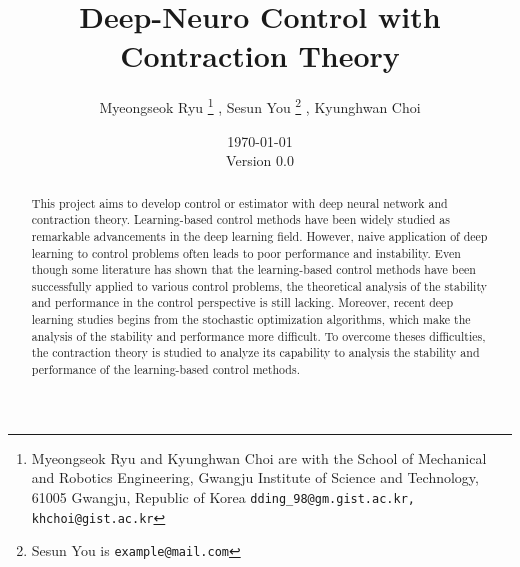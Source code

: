 \documentclass{article}
\title{
    Deep-Neuro Control with Contraction Theory
}
\author{
    Myeongseok Ryu
    \thanks{Myeongseok Ryu and Kyunghwan Choi are with the School of Mechanical and Robotics Engineering, Gwangju Institute of Science and Technology, 61005 Gwangju, Republic of Korea {\tt\small dding\_98@gm.gist.ac.kr, khchoi@gist.ac.kr}}%
    ,
    Sesun You
    \thanks{Sesun You is 
        {\tt\small example@mail.com}}%
    ,
    Kyunghwan Choi
    \footnotemark[1]
}
\date{
    \today
    \\
    Version 0.0
}
\newcommand*{\template}{../template}
\begin{document}
\maketitle

\begin{abstract}
    This project aims to develop control or estimator with deep neural network and contraction theory.
    Learning-based control methods have been widely studied as remarkable advancements in the deep learning field.
    However, naive application of deep learning to control problems often leads to poor performance and instability.
    Even though some literature has shown that the learning-based control methods have been successfully applied to various control problems, the theoretical analysis of the stability and performance in the control perspective is still lacking.
    Moreover, recent deep learning studies begins from the stochastic optimization algorithms, which make the analysis of the stability and performance more difficult.
    To overcome theses difficulties, the contraction theory is studied to analyze its capability to analysis the stability and performance of the learning-based control methods.
\end{abstract}

\tableofcontents









\begin{appendices}
\end{appendices}




\end{document}
